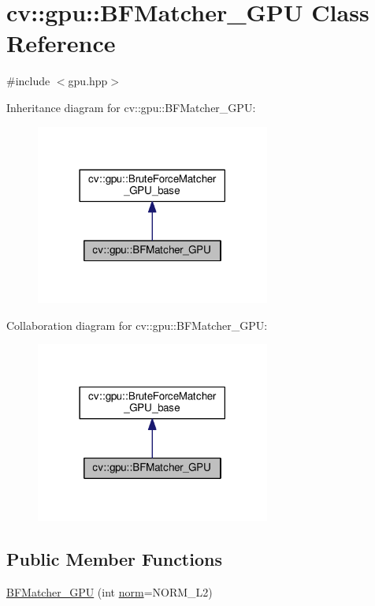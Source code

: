 \hypertarget{classcv_1_1gpu_1_1BFMatcher__GPU}{\section{cv\-:\-:gpu\-:\-:B\-F\-Matcher\-\_\-\-G\-P\-U Class Reference}
\label{classcv_1_1gpu_1_1BFMatcher__GPU}
}


{\ttfamily \#include $<$gpu.\-hpp$>$}



Inheritance diagram for cv\-:\-:gpu\-:\-:B\-F\-Matcher\-\_\-\-G\-P\-U\-:\nopagebreak
\begin{figure}[H]
\begin{center}
\leavevmode
\includegraphics[width=218pt]{classcv_1_1gpu_1_1BFMatcher__GPU__inherit__graph}
\end{center}
\end{figure}


Collaboration diagram for cv\-:\-:gpu\-:\-:B\-F\-Matcher\-\_\-\-G\-P\-U\-:\nopagebreak
\begin{figure}[H]
\begin{center}
\leavevmode
\includegraphics[width=218pt]{classcv_1_1gpu_1_1BFMatcher__GPU__coll__graph}
\end{center}
\end{figure}
\subsection*{Public Member Functions}
\begin{DoxyCompactItemize}
\item 
\hyperlink{classcv_1_1gpu_1_1BFMatcher__GPU_a7bc34b0624b81fbefea3287e817e2399}{B\-F\-Matcher\-\_\-\-G\-P\-U} (int \hyperlink{namespacecv_1_1gpu_ae9da8cdd56d17c434f5f0a0414f70806}{norm}=N\-O\-R\-M\-\_\-\-L2)
\end{DoxyCompactItemize}
